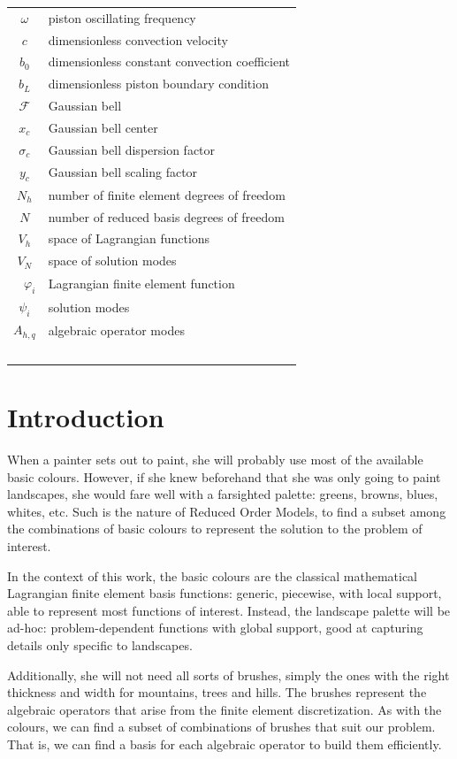 \documentclass[thesis.tex]{subfiles}
\begin{document}
\begin{table}[h]
\begin{tabular}{cl}
        $\omega$ & piston oscillating frequency  \\
        $c$ & dimensionless convection velocity \\
        $b_0$ & dimensionless constant convection coefficient \\
        $b_L$ & dimensionless piston boundary condition \\
        $\mathcal{F}$ & Gaussian bell \\
        $x_c$ & Gaussian bell center \\
        $\sigma_c$ & Gaussian bell dispersion factor \\
        $y_c$ & Gaussian bell scaling factor \\
        $N_h$ & number of finite element degrees of freedom \\ 
        $N$ & number of reduced basis degrees of freedom \\ 
        $V_h$ & space of Lagrangian functions\\ 
        $V_N$ & space of solution modes\\ 
        $\varphi_i$ & Lagrangian finite element function \\ 
        $\psi_i$ & solution modes \\
        $A_{h,q}$ & algebraic operator modes \\ 
    \end{tabular}
\end{table}

\newpage 
\section{Introduction}
When a painter sets out to paint, she will probably use most of the available basic colours.
However, if she knew beforehand that she was only going to paint landscapes, 
she would fare well with a farsighted palette: greens, browns, blues, whites, etc.
Such is the nature of Reduced Order Models, 
to find a subset among the combinations of basic colours 
to represent the solution to the problem of interest.

In the context of this work, 
the basic colours are the classical mathematical Lagrangian finite element basis functions: 
generic, piecewise, with local support, able to represent most functions of interest.
Instead, the landscape palette will be ad-hoc:
problem-dependent functions with global support, 
good at capturing details only specific to landscapes.

Additionally, she will not need all sorts of brushes, 
simply the ones with the right thickness and width for mountains, trees and hills.
The brushes represent the algebraic operators that arise from the finite element discretization.
As with the colours, we can find a subset of combinations of brushes that suit our problem.
That is, we can find a basis for each algebraic operator to build them efficiently.
\end{document}
